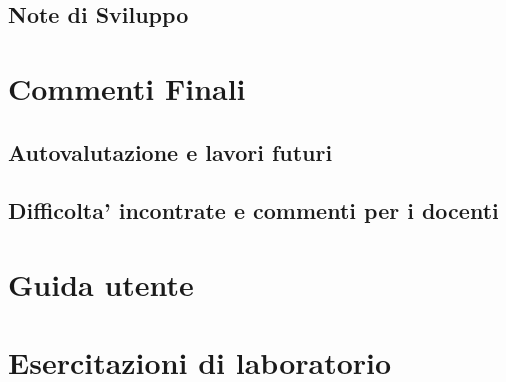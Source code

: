 \documentclass[a4paper,12pt]{report}
\begin{document}
\section{Note di Sviluppo}

\chapter{Commenti Finali}
\section{Autovalutazione e lavori futuri}
\section{Difficolta' incontrate e commenti per i docenti}

\appendix
\chapter{Guida utente}

\chapter{Esercitazioni di laboratorio}



\end{document}
